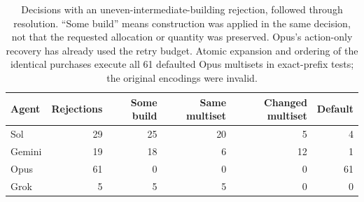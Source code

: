\begin{table}[t]
\centering\small
\begin{tabular}{lrrrrr}\toprule
Agent & Rejections & Some build & Same multiset & Changed multiset & Default\\\midrule
Sol & 29 & 25 & 20 & 5 & 4 \\
Gemini & 19 & 18 & 6 & 12 & 1 \\
Opus & 61 & 0 & 0 & 0 & 61 \\
Grok & 5 & 5 & 5 & 0 & 0 \\
\bottomrule\end{tabular}
\caption{Decisions with an uneven-intermediate-building rejection, followed through resolution. ``Some build'' means construction was applied in the same decision, not that the requested allocation or quantity was preserved. Opus's action-only recovery has already used the retry budget. Atomic expansion and ordering of the identical purchases execute all 61 defaulted Opus multisets in exact-prefix tests; the original encodings were invalid.}
\label{tab:recovery}
\end{table}
